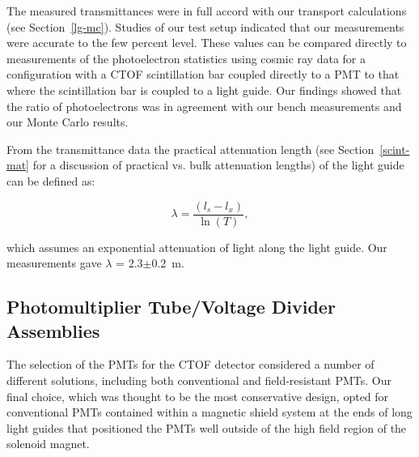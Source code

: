 \documentclass[3p,times,twocolumn]{elsarticle}
\begin{document}
The measured transmittances were in full accord with our transport calculations (see Section~\ref{lg-mc}).
Studies of our test setup indicated that our measurements were accurate to the few percent level. These
values can be compared directly to measurements of the photoelectron statistics using cosmic ray data for
a configuration with a CTOF scintillation bar coupled directly to a PMT to that where the scintillation bar is
coupled to a light guide. Our findings showed that the ratio of photoelectrons was in agreement with our
bench measurements and our Monte Carlo results.

From the transmittance data the practical attenuation length (see Section~\ref{scint-mat} for a discussion
of practical vs. bulk attenuation lengths) of the light guide can be defined as:

\begin{equation}
\label{pracat}
\lambda= \frac{(l_s-l_x)}{\ln(T)},
\end{equation}

\noindent
which assumes an exponential attenuation of light along the light guide. Our measurements gave
$\lambda$ = 2.3$\pm$0.2~m.

\subsection{Photomultiplier Tube/Voltage Divider Assemblies} 
\label{PMTs}

The selection of the PMTs for the CTOF detector considered a number of different solutions, including
both conventional and field-resistant PMTs. Our final choice, which was thought to be the most conservative
design, opted for conventional PMTs contained within a magnetic shield system at the ends of long light
guides that positioned the PMTs well outside of the high field region of the solenoid magnet.
\end{document}
